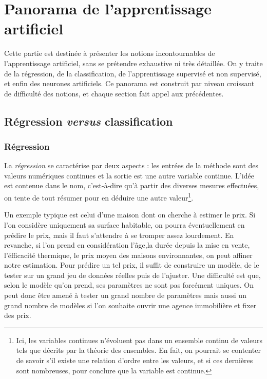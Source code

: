 \chapter{Panorama de l'apprentissage artificiel}

Cette partie est destinée à présenter les notions incontournables de l'apprentissage artificiel, sans se prétendre exhaustive ni très détaillée. On y traite de la régression, de la classification, de l'apprentissage supervisé et non supervisé, et enfin des neurones artificiels. Ce panorama est construit par niveau croissant de difficulté des notions, et chaque section fait appel aux précédentes.

\section{Régression \textit{versus} classification}
\subsection{Régression}

La \emph{régression} se caractérise par deux aspects : les entrées de la méthode sont des valeurs numériques continues et la sortie est une autre variable continue. L'idée est contenue dans le nom, c'est-à-dire qu'à partir des diverses mesures effectuées, on tente de tout résumer pour en déduire une autre valeur\footnote{Ici, les variables continues n'évoluent pas dans un ensemble continu de valeurs tels que décrits par la théorie des ensembles. En fait, on pourrait se contenter de savoir s'il existe une relation d'ordre entre les valeurs, et si ces dernières sont nombreuses, pour conclure que la variable est continue.}.

Un exemple typique est celui d'une maison dont on cherche à estimer le prix. Si l'on considère uniquement sa surface habitable, on pourra éventuellement en prédire le prix, mais il faut s'attendre à se tromper assez lourdement. En revanche, si l'on prend en considération l'âge,la durée depuis la mise en vente, l'éfficacité thermique, le prix moyen des maisons environnantes, on peut affiner notre estimation. Pour prédire un tel prix, il suffit de construire un modèle, de le tester sur un grand jeu de données réelles puis de l'ajuster. Une difficulté est que, selon le modèle qu'on prend, ses paramètres ne sont pas forcément uniques. On peut donc être amené à tester un grand nombre de paramètres mais aussi un grand nombre de modèles si l'on souhaite ouvrir une agence immobilière et fixer des prix.

